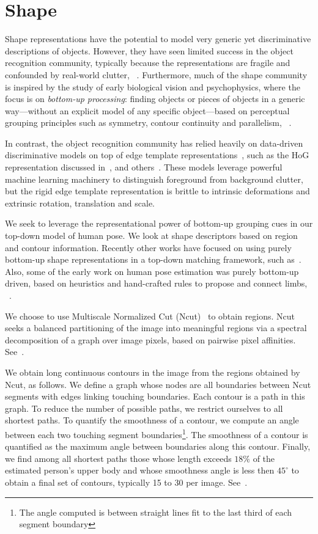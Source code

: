\section{Shape}\label{sec:shape}  Shape representations have the potential to 
model very generic yet discriminative descriptions of objects.  However, they 
have seen limited success in the object recognition community, typically 
because the representations are fragile and confounded by real-world clutter, 
\eg~\citet{shock-graphs}.  Furthermore, much of the shape community is inspired 
by the study of early biological vision and psychophysics, where the focus is 
on {\em bottom-up processing}: finding objects or pieces of objects in a 
generic way---without an explicit model of any specific object---based on 
perceptual grouping principles such as symmetry, contour continuity and
parallelism, \eg~\citet{biederman-geons}.

In contrast, the object recognition community has relied heavily on data-driven 
discriminative models on top of edge template representations~\citep{voc}, such 
as the HoG representation discussed in~, and 
others~\citep{dalal-triggs,viola02,dpm}.  These models leverage powerful 
machine learning machinery to distinguish foreground from background clutter, 
but the rigid edge template representation is brittle to intrinsic deformations 
and extrinsic rotation, translation and scale.

We seek to leverage the representational power of bottom-up grouping cues in 
our top-down model of human pose.  We look at shape descriptors based on region 
and contour information.  Recently other works have focused on using purely 
bottom-up shape representations in a top-down matching framework, such 
as~\citet{toshev2010,zhu2008contour,sminch11}.  Also, some of the early work on 
human pose estimation was purely bottom-up driven, based on heuristics and 
hand-crafted rules to propose and connect limbs, \eg~\citet{mori04,praveen07}.

We choose to use Multiscale Normalized Cut (Ncut)~\citep{cour05} to obtain 
regions.  Ncut seeks a balanced partitioning of the image into meaningful 
regions via a spectral decomposition of a graph over image pixels, based on 
pairwise pixel affinities. See~.

We obtain long continuous contours in the image from the regions obtained by 
Ncut, as follows.  We define a graph whose nodes are all boundaries between 
Ncut segments with edges linking touching boundaries. Each contour is a path in 
this graph. To reduce the number of possible paths, we restrict ourselves to 
all shortest paths. To quantify the smoothness of a contour, we compute an 
angle between each two touching segment boundaries\footnote{The angle computed 
is between straight lines fit to the last third of each segment boundary}. The 
smoothness of a contour is quantified as the maximum angle between boundaries 
along this contour. Finally, we find among all shortest paths those whose 
length exceeds $18\%$ of the estimated person's upper body and whose smoothness 
angle is less then $45^\circ$ to obtain a final set of contours, typically 15 
to 30 per image. See~.

